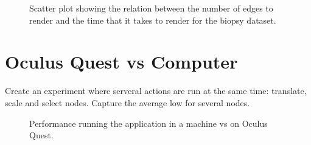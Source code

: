 \begin{figure}[h!]
  \centering
  \begin{minipage}{.8\textwidth}
  \end{minipage}
\caption{Scatter plot showing the relation between the number of edges to render and the time that it takes to render for the biopsy dataset.}
\label{fig:scalability_edges_biopsy}
\end{figure}

\section{Oculus Quest vs Computer}
Create an experiment where serveral actions are run at the same time: translate, scale and select nodes. Capture the average low for several nodes.

\begin{figure}[h!]
  \centering
  \begin{minipage}{.8\textwidth}
  \end{minipage}
\caption{Performance running the application in a machine vs on Oculus Quest.}
\label{fig:pc_vs_oculus}
\end{figure}

